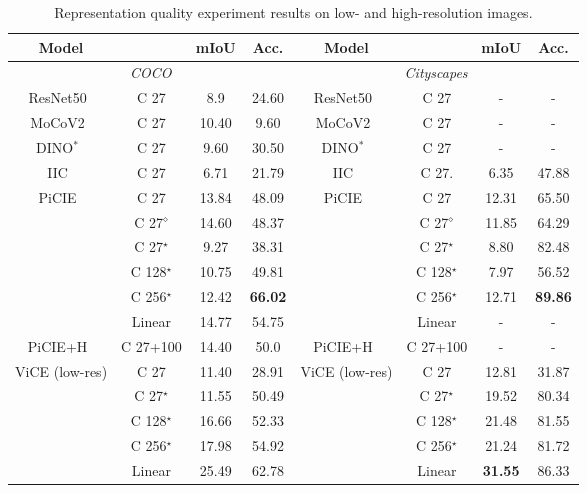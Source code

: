 \documentclass{bmvc2k}
\begin{document}
\setlength{\tabcolsep}{4pt}
\begin{table}[ht]
\begin{center}
\caption{Representation quality experiment results on low- and high-resolution images.}
\begin{tabular}{cccc|cccc}
\hline
Model &        & mIoU  & Acc. & Model  &       & mIoU  & Acc.  \\
\hline
\multicolumn{4}{c|}{\textit{COCO}} & \multicolumn{4}{c}{\textit{Cityscapes}}\\
ResNet50~\cite{He2016ResNet50}          & C 27 & 8.9  & 24.60 &   ResNet50~\cite{He2016ResNet50} &  C 27   & -  & - \\
MoCoV2~\cite{Chen2020MoCoV2}          &  C 27 & 10.40  & 9.60 &     MoCoV2~\cite{Chen2020MoCoV2} &   C 27   & -  & - \\
DINO$^*$~\cite{Caron2021DINO}          & C 27 & 9.60  & 30.50 &  DINO$^*$~\cite{Caron2021DINO}   & C 27  & -  & - \\
IIC~\cite{Ji2019IIC}          & C 27 & 6.71  & 21.79 & IIC~\cite{Ji2019IIC}  &     C 27.     & 6.35  & 47.88 \\
PiCIE~\cite{Cho2021PiCIE} & C 27   & 13.84 & 48.09 & PiCIE~\cite{Cho2021PiCIE} & C 27   & 12.31 & 65.50 \\
  & C 27$^\diamond$   & 14.60 & 48.37 &   & C 27$^\diamond$  & 11.85 & 64.29 \\
  & C 27$^\star$   & 9.27 & 38.31 &   & C 27$^\star$  & 8.80 & 82.48 \\
& C 128$^\star$   & 10.75 & 49.81 &  & C 128$^\star$   & 7.97 & 56.52 \\
 & C 256$^\star$   & 12.42 & \textbf{66.02} &  & C 256$^\star$   & 12.71 & \textbf{89.86} \\
 & Linear   & 14.77 & 54.75 &  & Linear  & - & - \\
PiCIE+H~\cite{Cho2021PiCIE} & C 27+100  & 14.40 & 50.0 & PiCIE+H~\cite{Cho2021PiCIE} & C 27+100 & - & - \\
ViCE (low-res) & C 27   & 11.40 & 28.91 & ViCE (low-res) & C 27 &  12.81 & 31.87 \\
 & C 27$^\star$   & 11.55 & 50.49 & & C 27$^\star$   & 19.52 & 80.34 \\
& C 128$^\star$   & 16.66 & 52.33 &  & C 128$^\star$   & 21.48 & 81.55 \\
 & C 256$^\star$   & 17.98 & 54.92 &  & C 256$^\star$   & 21.24 & 81.72 \\
 & Linear   & 25.49 & 62.78 &  & Linear  & \textbf{31.55} & 86.33 \\

\end{tabular}
\end{center}
\end{table}
\end{document}
